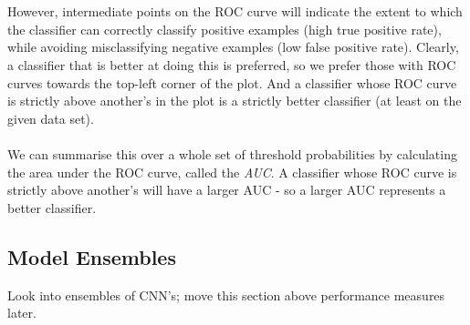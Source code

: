 \documentclass[11pt]{article} %
\theoremstyle{plain}
\theoremstyle{definition}
\begin{document}
\\
\\
\noindent
However, intermediate points on the ROC curve will indicate the extent to which the classifier can correctly classify positive examples (high true positive rate), while avoiding misclassifying negative examples (low false positive rate). Clearly, a classifier that is better at doing this is preferred, so we prefer those with ROC curves towards the top-left corner of the plot. And a classifier whose ROC curve is strictly above another's in the plot is a strictly better classifier (at least on the given data set).
\\
\\
\noindent
We can summarise this over a whole set of threshold probabilities by calculating the area under the ROC curve, called the \textit{AUC}. A classifier whose ROC curve is strictly above another's will have a larger AUC - so a larger AUC represents a better classifier.

\newpage
\subsection{Model Ensembles}
Look into ensembles of CNN's; move this section above performance measures later.

\newpage
\end{document}
